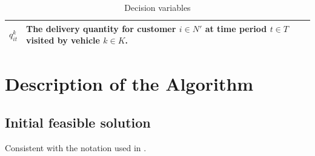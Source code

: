 \documentclass{article}
\begin{document}
\newpage

\begin{table}[ht]\caption{Decision variables}
\begin{tabular}{p{3cm}p{12cm}}
\toprule%
$q^k_{it}$ & The delivery quantity for customer $i\in N'$ at time period $t\in T$ visited by vehicle $k\in K$. \tabularnewline
\hline
\end{tabular}
\end{table}


\section{Description of the Algorithm}
\subsection{Initial feasible solution}

Consistent with the notation used in \cite{archetti2017minimizing}.



\end{document}
